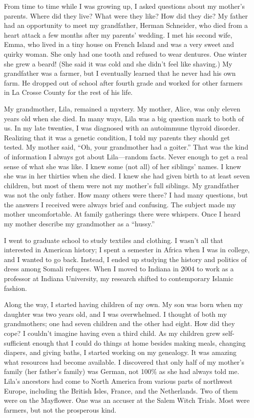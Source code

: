 \documentclass[
  american,
  letterpaper,
]{book}
\begin{document}
From time to time while I was growing up, I asked questions about my
mother's parents. Where did they live? What were they like? How did they
die? My father had an opportunity to meet my grandfather, Herman
Schneider, who died from a heart attack a few months after my parents'
wedding. I met his second wife, Emma, who lived in a tiny house on
French Island and was a very sweet and quirky woman. She only had one
tooth and refused to wear dentures. One winter she grew a beard! (She
said it was cold and she didn't feel like shaving.) My grandfather was a
farmer, but I eventually learned that he never had his own farm. He
dropped out of school after fourth grade and worked for other farmers in
La Crosse County for the rest of his life.

My grandmother, Lila, remained a mystery. My mother, Alice, was only
eleven years old when she died. In many ways, Lila was a big question
mark to both of us. In my late twenties, I was diagnosed with an
autoimmune thyroid disorder. Realizing that it was a genetic condition,
I told my parents they should get tested. My mother said, ``Oh, your
grandmother had a goiter.'' That was the kind of information I always
got about Lila---random facts. Never enough to get a real sense of what
she was like. I knew some (not all) of her siblings' names. I knew she
was in her thirties when she died. I knew she had given birth to at
least seven children, but most of them were not my mother's full
siblings. My grandfather was not the only father. How many others were
there? I had many questions, but the answers I received were always
brief and confusing. The subject made my mother uncomfortable. At family
gatherings there were whispers. Once I heard my mother describe my
grandmother as a ``hussy.''

I went to graduate school to study textiles and clothing. I wasn't all
that interested in American history; I spent a semester in Africa when I
was in college, and I wanted to go back. Instead, I ended up studying
the history and politics of dress among Somali refugees. When I moved to
Indiana in 2004 to work as a professor at Indiana University, my
research shifted to contemporary Islamic fashion.

Along the way, I started having children of my own. My son was born when
my daughter was two years old, and I was overwhelmed. I thought of both
my grandmothers; one had seven children and the other had eight. How did
they cope? I couldn't imagine having even a third child. As my children
grew self-sufficient enough that I could do things at home besides
making meals, changing diapers, and giving baths, I started working on
my genealogy. It was amazing what resources had become available. I
discovered that only half of my mother's family (her father's family)
was German, not 100\% as she had always told me. Lila's ancestors had
come to North America from various parts of northwest Europe, including
the British Isles, France, and the Netherlands. Two of them were on the
Mayflower. One was an accuser at the Salem Witch Trials. Most were
farmers, but not the prosperous kind.
\end{document}
